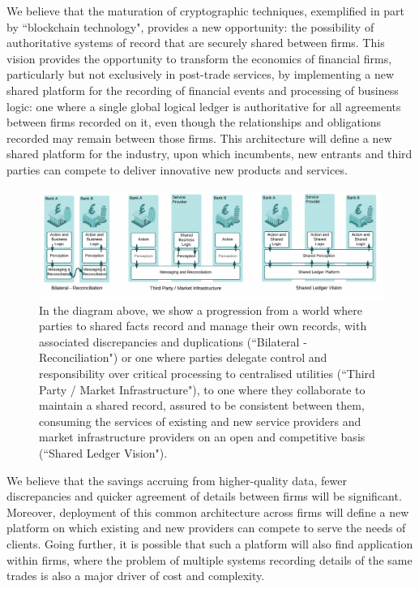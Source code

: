 \documentclass{article}
\begin{document}
We believe that the maturation of cryptographic techniques, exemplified in part by ``blockchain technology", provides a new opportunity: the possibility of authoritative systems of record that are securely shared between firms. This vision provides the opportunity to transform the economics of financial firms, particularly but not exclusively in post-trade services, by implementing a new shared platform for the recording of financial events and processing of business logic: one where a single global logical ledger is authoritative for all agreements between firms recorded on it, even though the relationships and obligations recorded may remain between those firms. This architecture will define a new shared platform for the industry, upon which incumbents, new entrants and third parties can compete to deliver innovative new products and services. 

\begin{figure}[H]
\includegraphics[scale=.5, center]{sharedlogic} 
\caption{In the diagram above, we show a progression from a world where parties to shared facts record and manage their own records, with associated discrepancies and duplications (``Bilateral - Reconciliation") or one where parties delegate control and responsibility over critical processing to centralised utilities (``Third Party / Market Infrastructure"), to one where they collaborate to maintain a shared record, assured to be consistent between them, consuming the services of existing and new service providers and market infrastructure providers on an open and competitive basis (``Shared Ledger Vision").}
\end{figure}


We believe that the savings accruing from higher-quality data, fewer discrepancies and quicker agreement of details between firms will be significant. Moreover, deployment of this common architecture across firms will define a new platform on which existing and new providers can compete to serve the needs of clients. Going further, it is possible that such a platform will also find application within firms, where the problem of multiple systems recording details of the same trades is also a major driver of cost and complexity.
\end{document}

